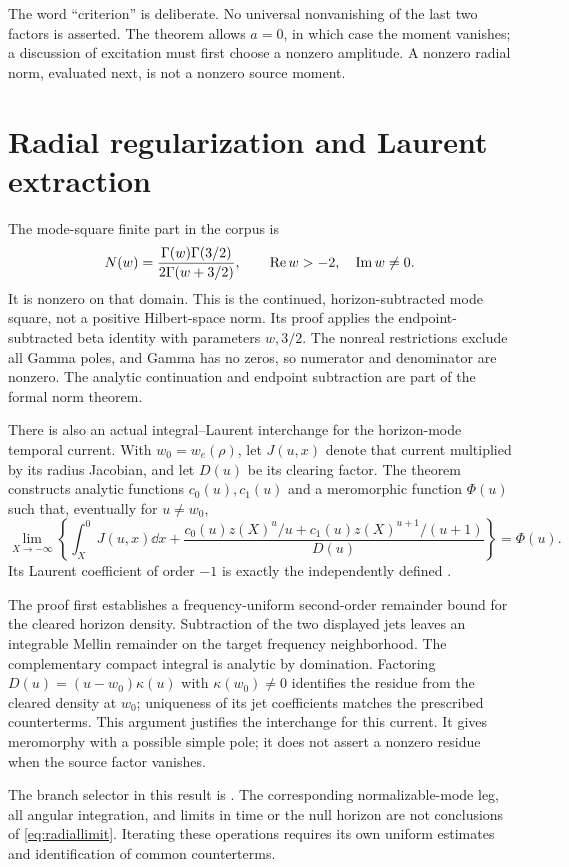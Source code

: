 The word ``criterion'' is deliberate. No universal nonvanishing of the last two factors is asserted. The theorem allows \(a=0\), in which case the moment vanishes; a discussion of excitation must first choose a nonzero amplitude. A nonzero radial norm, evaluated next, is not a nonzero source moment.

\section{Radial regularization and Laurent extraction}

The mode-square finite part in the corpus is
\begin{equation}\label{eq:betanorm}
 N(w)=\frac{\Gamma(w)\Gamma(3/2)}{2\Gamma(w+3/2)},
 \qquad \operatorname{Re} w>-2,\quad\operatorname{Im} w\ne0.
\end{equation}
It is nonzero on that domain. This is the continued, horizon-subtracted mode square, not a positive Hilbert-space norm.
Its proof applies the endpoint-subtracted beta identity with parameters \(w,3/2\). The nonreal restrictions exclude all Gamma poles, and Gamma has no zeros, so numerator and denominator are nonzero. The analytic continuation and endpoint subtraction are part of the formal norm theorem.

There is also an actual integral--Laurent interchange for the horizon-mode temporal current. With \(w_0=w_e(\rho)\), let \(J(u,x)\) denote that current multiplied by its radius Jacobian, and let \(D(u)\) be its clearing factor. The theorem constructs analytic functions \(c_0(u),c_1(u)\) and a meromorphic function \(\Phi(u)\) such that, eventually for \(u\ne w_0\),
\begin{equation}\label{eq:radiallimit}
 \lim_{X\to-\infty}\left\{\int_X^0J(u,x)\dd x+
 \frac{c_0(u)z(X)^u/u+c_1(u)z(X)^{u+1}/(u+1)}{D(u)}\right\}
 =\Phi(u).
\end{equation}
Its Laurent coefficient of order \(-1\) is exactly the independently defined .

The proof first establishes a frequency-uniform second-order remainder bound for the cleared horizon density. Subtraction of the two displayed jets leaves an integrable Mellin remainder on the target frequency neighborhood. The complementary compact integral is analytic by domination. Factoring \(D(u)=(u-w_0)\kappa(u)\) with \(\kappa(w_0)\ne0\) identifies the residue from the cleared density at \(w_0\); uniqueness of its jet coefficients matches the prescribed counterterms. This argument justifies the interchange for this current. It gives meromorphy with a possible simple pole; it does not assert a nonzero residue when the source factor vanishes.

The branch selector in this result is . The corresponding normalizable-mode leg, all angular integration, and limits in time or the null horizon are not conclusions of \eqref{eq:radiallimit}. Iterating these operations requires its own uniform estimates and identification of common counterterms.
